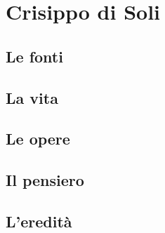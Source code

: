 \chapter{Crisippo di Soli}

\section{Le fonti}

\section{La vita}

\section{Le opere}

\section{Il pensiero}

\section{L'eredità}
